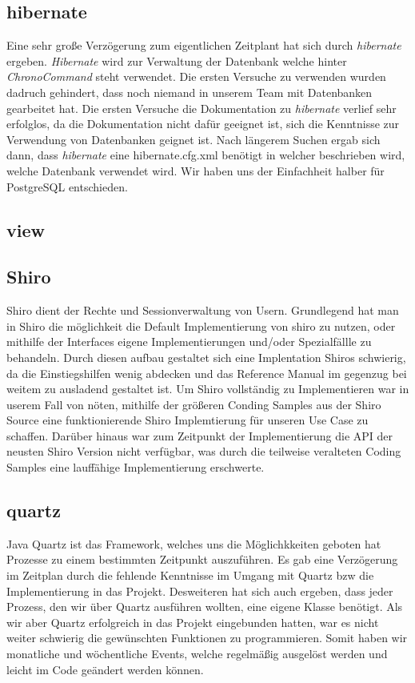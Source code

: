 \subsection{hibernate}
Eine sehr große Verzögerung zum eigentlichen Zeitplant hat sich durch \emph{hibernate} ergeben. \emph{Hibernate} wird zur Verwaltung der
Datenbank welche hinter \emph{ChronoCommand} steht verwendet. Die ersten Versuche  zu verwenden wurden dadruch
gehindert, dass noch niemand in unserem Team mit Datenbanken gearbeitet hat. Die ersten Versuche die Dokumentation zu 
\emph{hibernate} verlief sehr erfolglos, da die Dokumentation nicht dafür geeignet ist, sich die Kenntnisse zur Verwendung von
Datenbanken geignet ist. Nach längerem Suchen ergab sich dann, dass \emph{hibernate} eine hibernate.cfg.xml benötigt in welcher 
beschrieben wird, welche Datenbank verwendet wird. Wir haben uns der Einfachheit halber für PostgreSQL entschieden. 


\subsection{view} %
\subsection{Shiro}
Shiro dient der Rechte und Sessionverwaltung von Usern.
Grundlegend hat man in Shiro die möglichkeit die Default Implementierung von shiro zu nutzen, oder mithilfe der Interfaces
eigene Implementierungen und/oder Spezialfällle zu behandeln.
Durch diesen aufbau gestaltet sich eine Implentation Shiros schwierig, da die Einstiegshilfen wenig abdecken und das Reference Manual
im gegenzug bei weitem zu ausladend gestaltet ist. Um Shiro vollständig zu Implementieren war in userem Fall von nöten, mithilfe der
größeren Conding Samples aus der Shiro Source eine funktionierende Shiro Implemtierung für unseren Use Case zu schaffen.
Darüber hinaus war zum Zeitpunkt der Implementierung die API der neusten Shiro Version nicht verfügbar, was durch die teilweise veralteten Coding Samples
 eine lauffähige Implementierung erschwerte.
 
\subsection{quartz} %
Java Quartz ist das Framework, welches uns die Möglichkkeiten geboten hat Prozesse zu einem bestimmten Zeitpunkt auszuführen. Es gab eine Verzögerung im Zeitplan durch die fehlende Kenntnisse im Umgang mit Quartz bzw die Implementierung in das Projekt.
Desweiteren hat sich auch ergeben, dass jeder Prozess, den wir über Quartz ausführen wollten, eine eigene Klasse benötigt. Als wir aber Quartz erfolgreich in das Projekt eingebunden hatten, war es nicht weiter schwierig die gewünschten Funktionen zu programmieren. Somit haben wir monatliche und wöchentliche Events, welche regelmäßig ausgelöst werden und leicht im Code geändert werden können.


